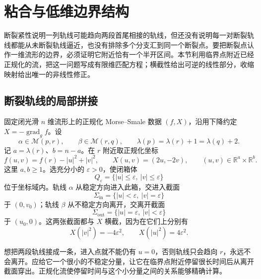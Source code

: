 
% 
% 

\section{粘合与低维边界结构}
\label{g2:sec:1803}

断裂紧性说明一列轨线可能趋向两段首尾相接的轨线，但还没有说明每一对断裂轨线都能从未断裂轨线逼近，也没有排除多个分支汇到同一个断裂点。要把断裂点认作一维流形的边界，必须证明它附近恰有一个半开区间。本节利用临界点附近已经正规化的流，把这一问题写成有限维匹配方程；横截性给出可逆的线性部分，收缩映射给出唯一的非线性修正。

\subsection{断裂轨线的局部拼接}
\label{g2:subsec:1803:01}

固定闭光滑 \(n\) 维流形上的正规化 Morse--Smale 数据 \((f,X)\)，沿用下降约定 \(X=-\operatorname{grad}_g f\)。设
\[
	\alpha\in\mathcal M(p,r),\qquad
	\beta\in\mathcal M(r,q),\qquad
	\lambda(p)=\lambda(r)+1=\lambda(q)+2.
\]
记 \(a=\lambda(r)\)、\(b=n-a\)。在 \(r\) 附近取正规化坐标
\[
	f(u,v)=f(r)-|u|^2+|v|^2,\qquad
	X(u,v)=(2u,-2v),\qquad
	(u,v)\in\mathbb R^a\times\mathbb R^b.
\]
这里 \(a,b\ge1\)。选充分小的 \(\varepsilon>0\)，使闭箱体
\[
	Q_\varepsilon=\{|u|\le\varepsilon,\ |v|\le\varepsilon\}
\]
位于坐标域内。轨线 \(\alpha\) 从稳定方向进入此箱，交进入截面
\[
	\Sigma_{\mathrm{in}}=\{|u|<\varepsilon,\ |v|=\varepsilon\}
\]
于 \((0,v_0)\)；轨线 \(\beta\) 从不稳定方向离开，交离开截面
\[
	\Sigma_{\mathrm{out}}=\{|u|=\varepsilon,\ |v|<\varepsilon\}
\]
于 \((u_0,0)\)。这两张截面都与 \(X\) 横截，因为在它们上分别有
\[
	X(|v|^2)=-4\varepsilon^2,\qquad X(|u|^2)=4\varepsilon^2.
\]

\ProseParagraphBreak

想把两段轨线接成一条，进入点就不能仍有 \(u=0\)，否则轨线只会趋向 \(r\)，永远不会离开。应给它一个很小的不稳定分量，让它在临界点附近停留很长时间后从离开截面穿出。正规化流使停留时间与这个小分量之间的关系能够精确计算。

